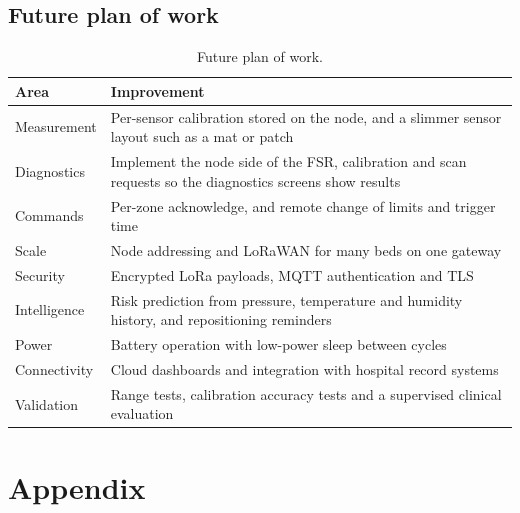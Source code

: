 \subsection{Future plan of work}
{\small{}
\begin{table}[H]
\centering
\begin{tabularx}{\textwidth}{@{}>{\raggedright\arraybackslash}p{3.0cm}X@{}}
\toprule
\textbf{Area} & \textbf{Improvement}\\
\midrule
Measurement & Per-sensor calibration stored on the node, and a slimmer sensor layout such as a mat or patch\\
Diagnostics & Implement the node side of the FSR, calibration and \itwoc{} scan requests so the diagnostics screens show results\\
Commands & Per-zone acknowledge, and remote change of limits and trigger time\\
Scale & Node addressing and LoRaWAN for many beds on one gateway\\
Security & Encrypted LoRa payloads, MQTT authentication and TLS\\
Intelligence & Risk prediction from pressure, temperature and humidity history, and repositioning reminders\\
Power & Battery operation with low-power sleep between cycles\\
Connectivity & Cloud dashboards and integration with hospital record systems\\
Validation & Range tests, calibration accuracy tests and a supervised clinical evaluation\\
\bottomrule
\end{tabularx}
\caption{Future plan of work.}
\end{table}}




\section*{Appendix}


